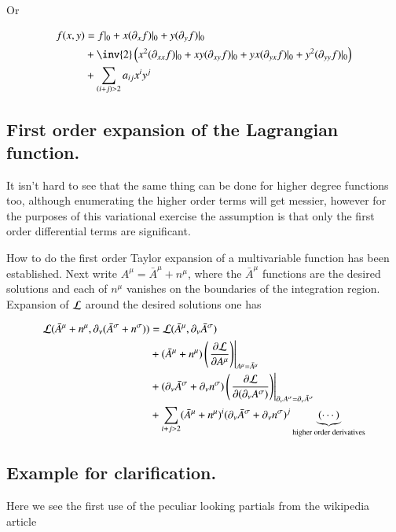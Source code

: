 \documentclass{article}
\newcommand{\barA}[0]{\bar{A}}
\begin{document}
Or

\begin{align*}
f(x,y) &= f \vert_0 + x (\partial_x f) \vert_0 + y (\partial_y f) \vert_0 \\
&+ \inv{2} \left( x^2 (\partial_{x x} f) \vert_0 + x y (\partial_{x y} f) \vert_0  + y x (\partial_{y x} f) \vert_0  + y^2(\partial_{y y} f) \vert_0 \right) \\
&+ \sum_{(i+j) > 2} a_{i j} x^i y^j
\end{align*}

\subsection{ First order expansion of the Lagrangian function. }

It isn't hard to see that the same thing can be done for higher degree functions too, although enumerating the 
higher order terms will get messier, however for the purposes of this variational exercise the assumption is that only
the first order differential terms are significant.

How to do the first order Taylor expansion of a multivariable function has been established.  Next write $A^\mu = \barA^\mu + n^\mu$, where the $\barA^\mu$ functions are the desired solutions and each of $n^\mu$ vanishes on the boundaries of the integration region.  Expansion of $\mathcal{L}$ around the desired solutions one has

\begin{align*}
\LL(\barA^\mu + n^\mu, \partial_\nu( \barA^\sigma + n^\sigma) )
&=
\LL(\barA^\mu, \partial_\nu \barA^\sigma ) \\
&+ (\barA^\mu + n^\mu) \left( \left. \PD{A^\mu}{\LL} \right) \right\vert_{A^\mu = \barA^\mu} \\
&+ (\partial_\nu \barA^\sigma + \partial_\nu n^\sigma) \left( \left. \PD{(\partial_\nu A^\sigma)}{\LL} \right) \right\vert_{\partial_\nu A^\sigma = \partial_\nu \barA^\sigma} \\
&+ \sum_{i+j>2} (\barA^\mu + n^\mu)^i (\partial_\nu \barA^\sigma + \partial_\nu n^\sigma)^j \underbrace{\left(\cdots\right)}_{\text{higher order derivatives}}
\end{align*}

\subsection{ Example for clarification. }
Here we see the first use of the peculiar looking partials from the wikipedia article
\end{document}
